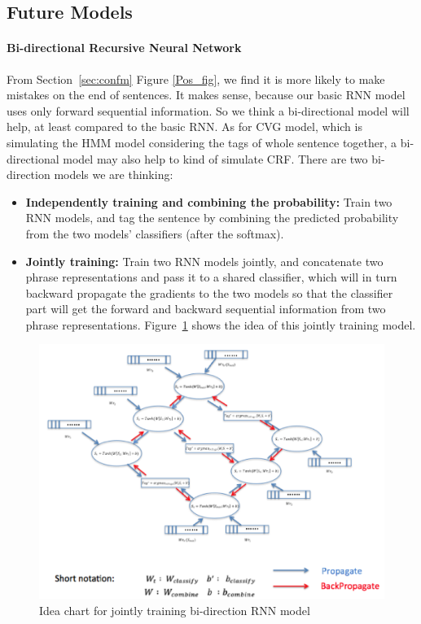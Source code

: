 \documentclass[11pt]{article}
\begin{document}
\subsection{Future Models}

\paragraph{Bi-directional Recursive Neural Network}
From Section~\ref{sec:confm} Figure \ref{Pos_fig}, we find it is more likely to make mistakes on the end of sentences. It makes sense, because our basic RNN model uses only forward sequential information. So we think a bi-directional model will help, at least compared to the basic RNN. As for CVG model, which is simulating the HMM model considering the tags of whole sentence together, a bi-directional model may also help to kind of simulate CRF. There are two bi-direction models we are thinking:
\begin{itemize}
\item \textbf{Independently training and combining the probability: } Train two RNN models, and tag the sentence by combining the predicted probability from the two models' classifiers (after the softmax). 
\item \textbf{Jointly training: } Train two RNN models jointly, and concatenate two phrase representations and pass it to a shared classifier, which will in turn backward propagate the gradients to the two models so that the classifier part will get the forward and backward sequential information from two phrase representations. Figure~\ref{fig:bi-direc} shows the idea of this jointly training model.
\end{itemize}
\begin{figure}
\includegraphics[scale=0.5]{bi_direct.png}
\caption{Idea chart for jointly training bi-direction RNN model}\label{fig:bi-direc}
\end{figure}
\end{document}

